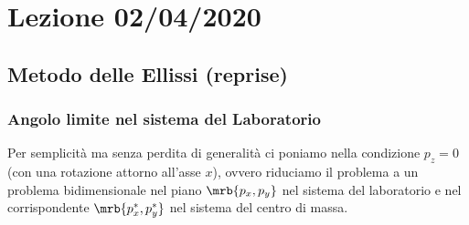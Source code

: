 \chapter{Lezione 02/04/2020}
\section{Metodo delle Ellissi (reprise)}
\subsection{Angolo limite nel sistema del Laboratorio}
Per semplicità ma senza perdita di generalità ci poniamo nella condizione $p_z
	= 0$ (con una rotazione attorno all'asse $x$), ovvero riduciamo il problema a
un problema bidimensionale nel piano $\mrb{p_x,p_y}$ nel sistema del
laboratorio e nel corrispondente $\mrb{p_x^\ast,p_y^\ast}$ nel sistema del
centro di massa.

